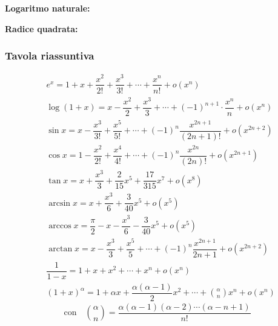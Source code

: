 \textbf{Logaritmo naturale:}

\textbf{Radice quadrata:}

\clearpage %
\subsubsection{Tavola riassuntiva}
\begin{align*}
	&e^x = 1 + x + \dfrac{x^2}{2!} + \dfrac{x^3}{3!} + \cdots + \dfrac{x^n}{n!} + o(x^n)\\[10pt]
	&\log(1 + x) = x - \dfrac{x^2}{2} + \dfrac{x^3}{3} + \cdots + (-1)^{n+1} \cdot \dfrac{x^n}{n} + o(x^n)\\[10pt]
	&\sin{x} = x - \dfrac{x^3}{3!} + \dfrac{x^5}{5!} + \cdots + (-1)^n \dfrac{x^{2n+1}}{(2n+1)!} + o(x^{2n+2})\\[10pt]
	&\cos{x} = 1 - \dfrac{x^2}{2!} + \dfrac{x^4}{4!} + \cdots + (-1)^n \dfrac{x^{2n}}{(2n)!} + o(x^{2n+1})\\[10pt]
	&\tan{x} = x + \dfrac{x^3}{3} + \dfrac{2}{15}x^5 + \dfrac{17}{315}x^7 + o(x^8)\\[10pt]
	&\arcsin{x} = x + \dfrac{x^3}{6} + \dfrac{3}{40}x^5 + o(x^5)\\[10pt]
	&\arccos{x} = \dfrac{\pi}{2} - x - \dfrac{x^3}{6} - \dfrac{3}{40} x^5 + o(x^5)\\[10pt]
	&\arctan{x} = x - \dfrac{x^3}{3} + \dfrac{x^5}{5} + \cdots + (-1)^n \dfrac{x^{2n+1}}{2n+1} + o(x^{2n+2})\\[10pt]
	&\dfrac{1}{1 - x} = 1 + x + x^2 + \cdots + x^n + o(x^n)\\[10pt]
	&(1 + x)^\alpha = 1 + \alpha x + \dfrac{\alpha(\alpha - 1)}{2} x^2 + \cdots +  \binom{\alpha}{n} x^n + o(x^n)
\end{align*}
\begin{equation*}
	\text{con} \quad \binom{\alpha}{n} = \dfrac{\alpha (\alpha - 1) (\alpha -2) \cdots (\alpha - n + 1)}{n!}
\end{equation*}
